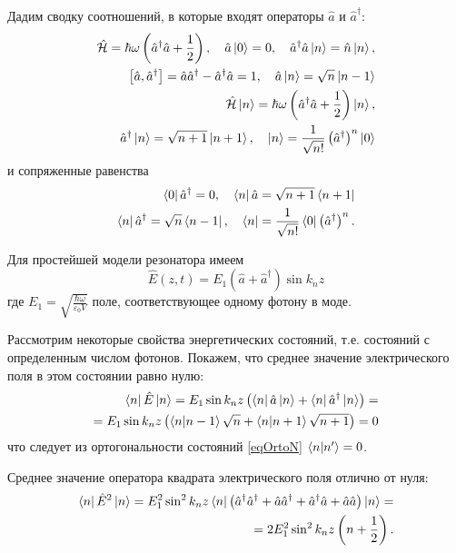 Дадим сводку соотношений, в которые входят операторы $\hat{a}$ и $\hat{a}^{\dag}$:
\begin{eqnarray}
\hat{\mathcal{H}} = \hbar \omega \left(\hat{a}^{\dag}\hat{a} +
\frac{1}{2} \right),
\quad
\hat{a}\ket{0} = 0,
\quad
\hat{a}^{\dag}\hat{a}\ket{n} = \hat{n}\ket{n},
\nonumber \\
\left[\hat{a}, \hat{a}^{\dag}\right] = \hat{a} \hat{a}^{\dag} - \hat{a}^{\dag}
\hat{a} = 1,
\quad
\hat{a}\ket{n} = \sqrt{n}\ket{n - 1}
\nonumber \\
\hat{\mathcal{H}}\ket{n} = \hbar \omega \left(\hat{a}^{\dag}\hat{a} +
\frac{1}{2} \right)\ket{n},
\nonumber \\
\hat{a}^{\dag}\ket{n} = \sqrt{n + 1}\ket{n + 1},
\quad
\ket{n} = \frac{1}{\sqrt{n!}}\left(\hat{a}^{\dag}\right)^n\ket{0}
\end{eqnarray}
и сопряженные равенства
\begin{eqnarray}
\bra{0}\hat{a}^{\dag} = 0,
\quad
\bra{n}\hat{a} = \sqrt{n + 1}\bra{n + 1}
\nonumber \\
\bra{n}\hat{a}^{\dag} = \sqrt{n}\bra{n - 1},
\quad
\bra{n} =  \frac{1}{\sqrt{n!}} \bra{0}\left(\hat{a}^{\dag}\right)^n.
\end{eqnarray}

Для простейшей модели резонатора имеем
\[
\hat{E}\left(z, t\right) = E_1\left( \hat{a} +
\hat{a}^{\dag}\right) \sin k_n z
\]
где $E_1 = \sqrt{\frac{\hbar \omega}{\varepsilon_0 V}}$  поле,
соответствующее одному фотону в моде.  

Рассмотрим некоторые свойства энергетических состояний, т.е. состояний
с определенным числом фотонов. Покажем, что среднее значение
электрического поля в этом состоянии равно нулю: 
\begin{eqnarray}
\bra{n}\hat{E}\ket{n} = 
E_1 \sin k_n z \left( \bra{n}\hat{a}\ket{n} +
\bra{n}\hat{a}^{\dag}\ket{n}\right) =
\nonumber \\
= E_1 \sin k_n z \left( \bra{n}\ket{n - 1} \sqrt{n} +
\bra{n}\ket{n + 1} \sqrt{n + 1}
\right) = 0
\label{eqCh1_E_middle}
\end{eqnarray}
что следует из ортогональности состояний \eqref{eqOrtoN}
$\bra{n}\ket{n'} = 0$.

Среднее значение оператора квадрата электрического поля отлично от нуля:
\begin{eqnarray}
\bra{n}\hat{E}^2\ket{n} = 
E_1^2 \sin^2 k_n z \bra{n}
\left(
\hat{a}^{\dag} \hat{a}^{\dag} + \hat{a} \hat{a}^{\dag} + \hat{a}^{\dag} \hat{a} +
\hat{a} \hat{a}
\right)
\ket{n} =
\nonumber \\
= 2 E_1^2 \sin^2 k_n z \left( n + \frac{1}{2}
\right).
\label{eqCh1_E2_middle}
\end{eqnarray}

